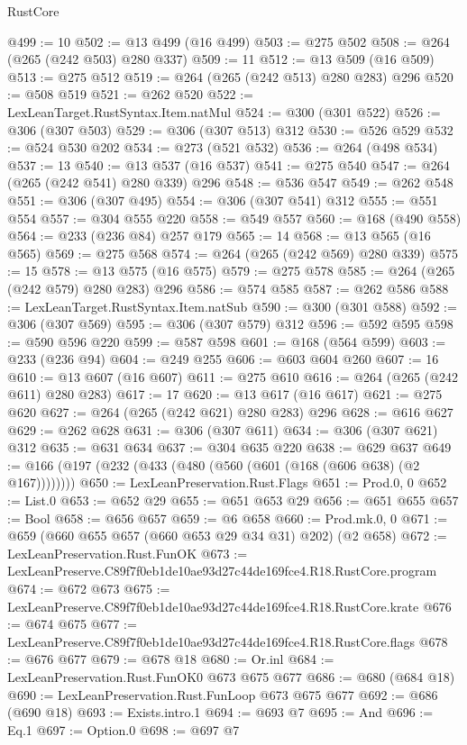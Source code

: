 \begin{lexlean}{RustCore}
\begin{coremodule}
@499 := 10
@502 := @13 @499 (@16 @499)
@503 := @275 @502
@508 := @264 (@265 (@242 @503) @280 @337)
@509 := 11
@512 := @13 @509 (@16 @509)
@513 := @275 @512
@519 := @264 (@265 (@242 @513) @280 @283) @296
@520 := @508 @519
@521 := @262 @520
@522 := LexLeanTarget.RustSyntax.Item.natMul
@524 := @300 (@301 @522)
@526 := @306 (@307 @503)
@529 := @306 (@307 @513) @312
@530 := @526 @529
@532 := @524 @530 @202
@534 := @273 (@521 @532)
@536 := @264 (@498 @534)
@537 := 13
@540 := @13 @537 (@16 @537)
@541 := @275 @540
@547 := @264 (@265 (@242 @541) @280 @339) @296
@548 := @536 @547
@549 := @262 @548
@551 := @306 (@307 @495)
@554 := @306 (@307 @541) @312
@555 := @551 @554
@557 := @304 @555 @220
@558 := @549 @557
@560 := @168 (@490 @558)
@564 := @233 (@236 @84) @257 @179
@565 := 14
@568 := @13 @565 (@16 @565)
@569 := @275 @568
@574 := @264 (@265 (@242 @569) @280 @339)
@575 := 15
@578 := @13 @575 (@16 @575)
@579 := @275 @578
@585 := @264 (@265 (@242 @579) @280 @283) @296
@586 := @574 @585
@587 := @262 @586
@588 := LexLeanTarget.RustSyntax.Item.natSub
@590 := @300 (@301 @588)
@592 := @306 (@307 @569)
@595 := @306 (@307 @579) @312
@596 := @592 @595
@598 := @590 @596 @220
@599 := @587 @598
@601 := @168 (@564 @599)
@603 := @233 (@236 @94)
@604 := @249 @255
@606 := @603 @604 @260
@607 := 16
@610 := @13 @607 (@16 @607)
@611 := @275 @610
@616 := @264 (@265 (@242 @611) @280 @283)
@617 := 17
@620 := @13 @617 (@16 @617)
@621 := @275 @620
@627 := @264 (@265 (@242 @621) @280 @283) @296
@628 := @616 @627
@629 := @262 @628
@631 := @306 (@307 @611)
@634 := @306 (@307 @621) @312
@635 := @631 @634
@637 := @304 @635 @220
@638 := @629 @637
@649 := @166 (@197 (@232 (@433 (@480 (@560 (@601 (@168 (@606 @638) (@2 @167))))))))
@650 := LexLeanPreservation.Rust.Flags
@651 := Prod.{0, 0}
@652 := List.{0}
@653 := @652 @29
@655 := @651 @653 @29
@656 := @651 @655
@657 := Bool
@658 := @656 @657
@659 := @6 @658
@660 := Prod.mk.{0, 0}
@671 := @659 (@660 @655 @657 (@660 @653 @29 @34 @31) @202) (@2 @658)
@672 := LexLeanPreservation.Rust.FunOK
@673 := LexLeanPreserve.C89f7f0eb1de10ae93d27c44de169fce4.R18.RustCore.program
@674 := @672 @673
@675 := LexLeanPreserve.C89f7f0eb1de10ae93d27c44de169fce4.R18.RustCore.krate
@676 := @674 @675
@677 := LexLeanPreserve.C89f7f0eb1de10ae93d27c44de169fce4.R18.RustCore.flags
@678 := @676 @677
@679 := @678 @18
@680 := Or.inl
@684 := LexLeanPreservation.Rust.FunOK0 @673 @675 @677
@686 := @680 (@684 @18)
@690 := LexLeanPreservation.Rust.FunLoop @673 @675 @677
@692 := @686 (@690 @18)
@693 := Exists.intro.{1}
@694 := @693 @7
@695 := And
@696 := Eq.{1}
@697 := Option.{0}
@698 := @697 @7

\end{coremodule}
\end{lexlean}
